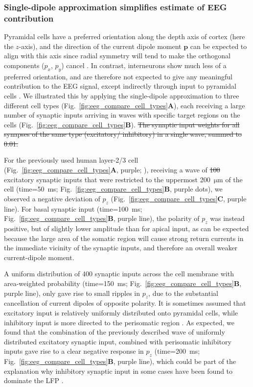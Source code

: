 \documentclass[preprint,10pt,authoryear]{elsarticle}
\newcommand{\hlg}[2][Emerald]{ {\sethlcolor{#1} \hl{#2}} }
\newcommand{\tvnnote}[1]{\color{white}{\hlg{TVN: #1 }}\color{black}}
\newcommand{\tvntxt}[1]{{\color{Emerald}#1}}
\begin{document}
\subsubsection{Single-dipole approximation simplifies estimate of EEG contribution}

Pyramidal cells have a preferred orientation along the depth axis of cortex (here the $z$-axis), and the direction of the current dipole moment $\mathbf{p}$ can be expected to align with this axis since
radial symmetry will tend to make the orthogonal components ($p_x$, $p_y$) cancel \citep{HAGEN2018}. 
In contrast, interneurons show much less of a preferred orientation, and are therefore not expected to give any meaningful contribution to the EEG signal, except indirectly through input to pyramidal cells \citep{HAGEN2016}.
We illustrated this by applying the single-dipole approximation to three different cell types (Fig.~\ref{fig:eeg_compare_cell_types}\textbf{A}), each receiving a large number of synaptic inputs arriving in waves with specific target regions on the cells (Fig.~\ref{fig:eeg_compare_cell_types}\textbf{B}). \tvntxt{\sout{The synaptic input weights for all synapses of the same type (excitatory/ inhibitory) in a single wave, summed to 0.01. }}

For the previously used human layer-2/3 cell (Fig.~\ref{fig:eeg_compare_cell_types}\textbf{A}, purple; \cite{EYAL2016}),
receiving a wave of \tvntxt{\sout{100}} excitatory synaptic inputs that were restricted to the uppermost 200~$\si{\um}$ of the cell (time=50~ms; Fig.~\ref{fig:eeg_compare_cell_types}\textbf{B}, purple dots), we observed a negative deviation of $p_z$ (Fig.~\ref{fig:eeg_compare_cell_types}\textbf{C}, purple line). For basal synaptic input (time=100~ms; Fig.~\ref{fig:eeg_compare_cell_types}\textbf{B}, purple line), the polarity of $p_z$ was instead positive, but of slightly lower amplitude than for apical input, as can be expected because the large area of the somatic region will cause strong return currents in the immediate vicinity of the synaptic inputs, and therefore an overall weaker current-dipole moment.


A uniform distribution of 400 synaptic inputs across the cell membrane with area-weighted probability (time=150~ms; Fig.~\ref{fig:eeg_compare_cell_types}\textbf{B}, purple line), only gave rise to small ripples in $p_z$, due to the substantial cancellation of current dipoles of opposite polarity. It is sometimes assumed that excitatory input is relatively uniformly distributed onto pyramidal cells, while inhibitory input is more directed to the perisomatic region \citep{Mazzoni2015, Telenczuk2019, Skaar2020, Telenczuk2020}. As expected, we found that the combination of the previously described wave of uniformly distributed excitatory synaptic input, combined with perisomatic inhibitory inputs gave rise to a clear negative response in $p_z$ (time=200~ms; Fig.~\ref{fig:eeg_compare_cell_types}\textbf{B}, purple line), which could be part of the explanation why inhibitory synaptic input in some cases have been found to dominate the LFP \citep{HAGEN2016, TELENCZUK2016}.
\end{document}

